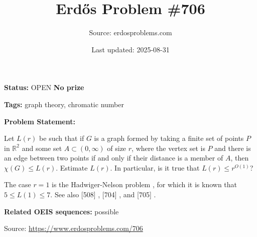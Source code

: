 \documentclass{article}
\title{Erd\H{o}s Problem \#706}
\date{Last updated: 2025-08-31}
\author{Source: erdosproblems.com}
\begin{document}
\maketitle

\noindent\textbf{Status:} OPEN \quad \textbf{No prize}

\noindent\textbf{Tags:} graph theory, chromatic number

\medskip

\noindent\textbf{Problem Statement:}

Let $L(r)$ be such that if $G$ is a graph formed by taking a finite set of points $P$ in $\mathbb{R}^2$ and some set $A\subset (0,\infty)$ of size $r$, where the vertex set is $P$ and there is an edge between two points if and only if their distance is a member of $A$, then $\chi(G)\leq L(r)$. Estimate $L(r)$. In particular, is it true that $L(r)\leq r^{O(1)}$?




The case $r=1$ is the Hadwiger-Nelson problem , for which it is known that $5\leq L(1)\leq 7$. See also [508] , [704] , and [705] .

\noindent\textbf{Related OEIS sequences:} possible


\bigskip
\noindent\small{Source: \url{https://www.erdosproblems.com/706}}
\end{document}
